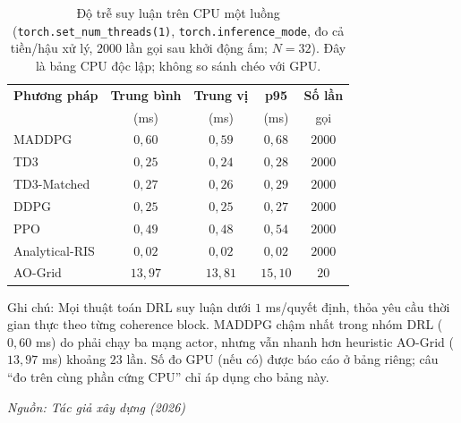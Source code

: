 \begin{table}[t]
\centering
\small
\caption{Độ trễ suy luận trên CPU một luồng (\texttt{torch.set\_num\_threads(1)}, \texttt{torch.inference\_mode}, đo cả tiền/hậu xử lý, $2000$ lần gọi sau khởi động ấm; $N=32$). Đây là bảng CPU độc lập; không so sánh chéo với GPU.}
\label{tab:latency_cpu}
\begin{tabular}{lcccc}
\toprule
\textbf{Phương pháp} & \textbf{Trung bình} & \textbf{Trung vị} & \textbf{p95} & \textbf{Số lần} \\
                     & (ms)                & (ms)              & (ms)          & gọi            \\
\midrule
MADDPG          & $0{,}60$  & $0{,}59$  & $0{,}68$  & $2000$ \\
TD3             & $0{,}25$  & $0{,}24$  & $0{,}28$  & $2000$ \\
TD3-Matched     & $0{,}27$  & $0{,}26$  & $0{,}29$  & $2000$ \\
DDPG            & $0{,}25$  & $0{,}25$  & $0{,}27$  & $2000$ \\
PPO             & $0{,}49$  & $0{,}48$  & $0{,}54$  & $2000$ \\
\midrule
Analytical-RIS  & $0{,}02$  & $0{,}02$  & $0{,}02$  & $2000$ \\
AO-Grid         & $13{,}97$ & $13{,}81$ & $15{,}10$ & $20$   \\
\bottomrule
\end{tabular}

\vspace{0.2em}
{\footnotesize Ghi chú: Mọi thuật toán DRL suy luận dưới $1$ ms/quyết định, thỏa yêu cầu thời gian thực theo từng coherence block. MADDPG chậm nhất trong nhóm DRL ($0{,}60$ ms) do phải chạy ba mạng actor, nhưng vẫn nhanh hơn heuristic AO-Grid ($13{,}97$ ms) khoảng $23$ lần. Số đo GPU (nếu có) được báo cáo ở bảng riêng; câu ``đo trên cùng phần cứng CPU'' chỉ áp dụng cho bảng này.\par}
\hfill {\footnotesize\itshape Nguồn: Tác giả xây dựng (2026)}
\end{table}
